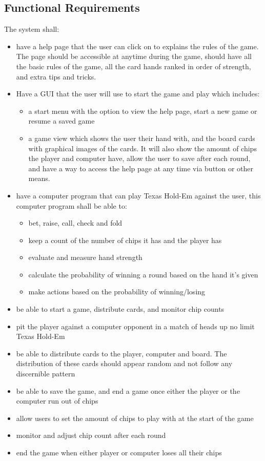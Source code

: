 \documentclass[12pt]{article}
\begin{document}
	\subsection{Functional Requirements}
	The system shall:
	\begin{itemize}
	\item 	have a help page that the user can click on to explains the rules of the game. The page should be accessible at anytime during the game, should have all the basic rules of the game, all the card hands ranked in order of strength, and extra tips and tricks.
	\item 	Have a GUI that the user will use to start the game and play which includes:
	\begin{itemize}
	\item a start menu with the option to view the help page, start a new game or resume a saved game
	\item a game view which shows the user their hand with, and the board cards with graphical images of the cards. It will also show the amount of chips the player and computer have, allow the user to save after each round, and have a way to access the help page at any time via button or other means. 
	\end{itemize}
	\item 	have a computer program that can play Texas Hold-Em against the user, this computer program shall be able to:
	\begin{itemize}
	\item	bet, raise, call, check and fold
	\item 	keep a count of the number of chips it has and the player has
	\item 	evaluate and measure hand strength
	\item	calculate the probability of winning a round based on the hand it’s given
	\item 	make actions based on the probability of winning/losing
	\end{itemize}
	\item 	be able to start a game, distribute cards, and monitor chip counts
	\item	pit the player against a computer opponent in a match of heads up no limit 					Texas Hold-Em
	\item 	be able to distribute cards to the player, computer and board. The distribution of these cards should appear random and not follow any discernible pattern
	\item	be able to save the game, and end a game once either the player or the computer 			run out of chips
	\item 	allow users to set the amount of chips to play with at the start of the game
	\item 	monitor and adjust chip count after each round
	\item 	end the game when either player or computer loses all their chips
	\end{itemize}
	
\end{document}
